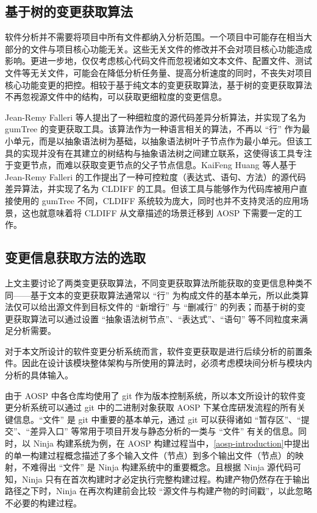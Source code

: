 \subsection{基于树的变更获取算法}

软件分析并不需要将项目中所有文件都纳入分析范围。一个项目中可能存在相当大部分的文件与项目核心功能无关。这些无关文件的修改并不会对项目核心功能造成影响。更进一步地，仅仅考虑核心代码文件而忽视诸如文本文件、配置文件、测试文件等无关文件，可能会在降低分析任务量、提高分析速度的同时，不丧失对项目核心功能变更的把控。相较于基于纯文本的变更获取算法，基于树的变更获取算法不再忽视源文件中的结构，可以获取更细粒度的变更信息。

Jean-Remy Falleri 等人提出了一种细粒度的源代码差异分析算法，并实现了名为 gumTree 的变更获取工具\cite{DBLP:conf/kbse/FalleriMBMM14}。该算法作为一种语言相关的算法，不再以 “行” 作为最小单元，而是以抽象语法树为基础，以抽象语法树叶子节点作为最小单元。但该工具的实现并没有在其建立的树结构与抽象语法树之间建立联系，这使得该工具专注于变更节点，而难以获取变更节点的父子节点信息。KaiFeng Huang 等人基于 Jean-Remy Falleri 的工作提出了一种可控粒度（表达式、语句、方法）的源代码差异算法，并实现了名为 CLDIFF 的工具\cite{10.1145/3238147.3238219}。但该工具与能够作为代码库被用户直接使用的 gumTree 不同，CLDIFF 系统较为庞大，同时也并不支持灵活的应用场景，这也就意味着将 CLDIFF 从文章描述的场景迁移到 AOSP 下需要一定的工作。

\subsection{变更信息获取方法的选取}

上文主要讨论了两类变更获取算法，不同变更获取算法所能获取的变更信息种类不同——基于文本的变更获取算法通常以 “行” 为构成文件的基本单元，所以此类算法仅可以给出源文件到目标文件的 “新增行” 与 “删减行” 的列表；而基于树的变更获取算法可以通过设置 “抽象语法树节点”、“表达式”、“语句” 等不同粒度来满足分析需要。

对于本文所设计的软件变更分析系统而言，软件变更获取是进行后续分析的前置条件。因此在设计该模块整体架构与所使用的算法时，必须考虑模块间分析与模块内分析的具体输入。

由于 AOSP 中各仓库均使用了 git 作为版本控制系统，所以本文所设计的软件变更分析系统可以通过 git 中的二进制对象获取 AOSP 下某仓库研发流程的所有关键信息。“文件” 是 git 中重要的基本单元，通过 git 可以获得诸如 “暂存区”、“提交”、“差异入口” 等常用于项目开发与静态分析的一类与 “文件” 有关的信息。同时，以 Ninja 构建系统为例，在 AOSP 构建过程当中，\ref{aosp-introduction}中提出的单一构建过程概念描述了多个输入文件（节点）到多个输出文件（节点）的映射，不难得出 “文件” 是 Ninja 构建系统中的重要概念。且根据 Ninja 源代码可知，Ninja 只有在首次构建时才必定执行完整构建过程。构建产物仍然存在于输出路径之下时，Ninja 在再次构建前会比较 “源文件与构建产物的时间戳”，以此忽略不必要的构建过程。

